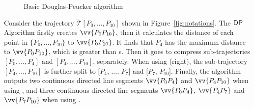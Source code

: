 \begin{figure}[tb!]
\vspace{1ex}
\begin{center}
{\small
\begin{minipage}{3.3in}
\myhrule \vspace{-1ex}
\vspace{-2.5ex}
\myhrule
\end{minipage}
}
\end{center}
\vspace{-3ex}
\caption{\small Basic Douglas-Peucker algorithm}
\label{alg:dp}
\vspace{-3ex}
\end{figure}


\begin{example}
\label{exm-alg-lsa}
Consider the trajectory $\dddot{\mathcal{T}}[P_0,\ldots,P_{10}]$ shown in Figure~\ref{fig:notations}.
The ${\mathsf{DP}}$ Algorithm firstly creates $\vv{P_0P_{10}}$, then it calculates the distance of each point in $\{P_0,\ldots,P_{10}\}$ to $\vv{P_0P_{10}}$.
It finds that $P_{4}$ has the maximum distance to $\vv{P_0P_{10}}$, which is greater than $\epsilon$. Then it goes to compress sub-trajectories $[P_0, \ldots, P_{4}]$ and $[P_{4}, \ldots, P_{10}]$, separately.
When using \sed (right), the sub-trajectory $[P_4,\ldots, P_{10}]$ is further split to $[P_4$, $\ldots$, $P_7]$ and $[P_7$, $P_{10}]$.
Finally, the algorithm outputs two continuous directed line segments $\vv{P_0P_4}$ and $\vv{P_4P_{10}}$ when using \ped, and three continuous directed line segments $\vv{P_0P_4}$, $\vv{P_4P_7}$ and $\vv{P_7P_{10}}$ when using \sed.
\end{example}



